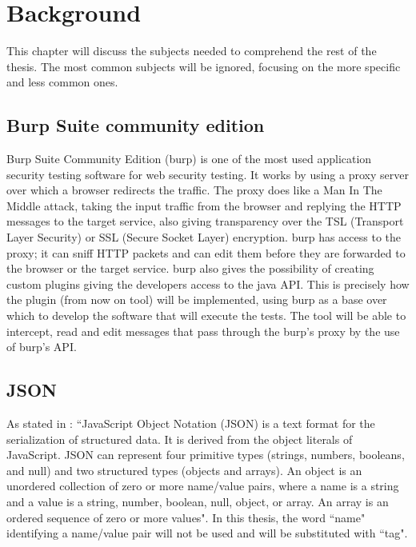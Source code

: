 \chapter{Background}
\label{chap:Background}
This chapter will discuss the subjects needed to comprehend the rest of the thesis. The most common subjects will be ignored, focusing on the more specific and less common ones.

\section{Burp Suite community edition}
Burp Suite Community Edition (\Gls{burp}) is one of the most used application security testing software for web security testing. It works by using a proxy server over which a browser redirects the traffic. The proxy does like a Man In The Middle attack, taking the input traffic from the browser and replying the HTTP messages to the target service, also giving transparency over the TSL (Transport Layer Security) or SSL (Secure Socket Layer) encryption. \Gls{burp} has access to the proxy; it can sniff HTTP packets and can edit them before they are forwarded to the browser or the target service. \Gls{burp} also gives the possibility of creating custom plugins giving the developers access to the java API. This is precisely how the plugin (from now on tool) will be implemented, using \Gls{burp} as a base over which to develop the software that will execute the tests. The tool will be able to intercept, read and edit messages that pass through the \Gls{burp}'s proxy by the use of \Gls{burp}'s API.

\section{JSON}
As stated in \cite{json_standard}: ``JavaScript Object Notation (JSON) is a text format for the serialization of structured data.  It is derived from the object literals of JavaScript. JSON can represent four primitive types (strings, numbers, booleans, and null) and two structured types (objects and arrays). An object is an unordered collection of zero or more name/value pairs, where a name is a string and a value is a string, number, boolean, null, object, or array. An array is an ordered sequence of zero or more values".
In this thesis, the word ``name" identifying a name/value pair will not be used and will be substituted with ``tag".

